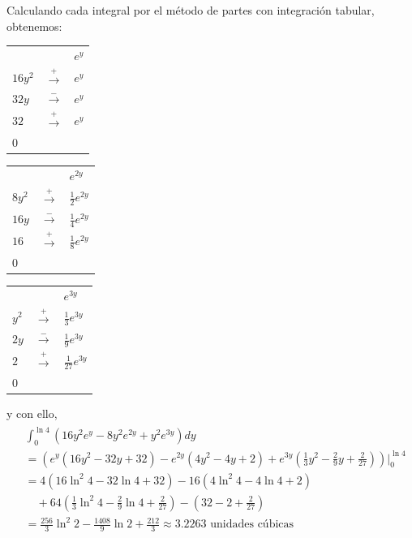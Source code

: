 Calculando cada integral por el método de partes con integración tabular,
obtenemos:
\begin{center}
  \begin{tabular}{lll}
    & & $e^{y}$ \\
    $16y^{2}$ & $\overset{+}{\longrightarrow }$ & $e^{y}$ \\
    $32y$ & $\overset{-}{\longrightarrow }$ & $e^{y}$ \\
    $32$ & $\overset{+}{\longrightarrow }$ & $e^{y}$ \\
    $0$ & &
  \end{tabular}
  \quad\quad
  \begin{tabular}{lll}
    & & $e^{2y}$ \\
    $8y^{2}$ & $\overset{+}{\longrightarrow }$ & $\frac{1}{2}e^{2y}$ \\
    $16y$ & $\overset{-}{\longrightarrow }$ & $\frac{1}{4}e^{2y}$ \\
    $16$ & $\overset{+}{\longrightarrow }$ & $\frac{1}{8}e^{2y}$ \\
    $0$ & &
  \end{tabular}
  \quad\quad
  \begin{tabular}{lll}
    & & $e^{3y}$ \\
    $y^{2}$ & $\overset{+}{\longrightarrow }$ & $\frac{1}{3}e^{3y}$ \\
    $2y$ & $\overset{-}{\longrightarrow }$ & $\frac{1}{9}e^{3y}$ \\
    $2$ & $\overset{+}{\longrightarrow }$ & $\frac{1}{27}e^{3y}$ \\
    $0$ & &
  \end{tabular}
\end{center}

y con ello,
\begin{gather*}
  \begin{aligned}
    &\int_{0}^{\ln 4}\left(
    16y^{2}e^{y}-8y^{2}e^{2y}+y^{2}e^{3y}\right) dy\\
    &=\left( e^{y}\left( 16y^{2}-32y+32\right) -e^{2y}\left( 4y^{2}-4y+2\right)
    +e^{3y}\left( \frac{1}{3}y^{2}-\frac{2}{9}y+\frac{2}{27}\right) \right)\Bigg|_{0}^{\ln 4} \\
    &=4\left( 16\ln ^{2}4-32\ln 4+32\right) -16\left( 4\ln ^{2}4-4\ln
    4+2\right) \\
    &\quad +64\left( \frac{1}{3}\ln ^{2}4-\frac{2}{9}\ln 4+\frac{2}{27}\right)-\left( 32-2+\frac{2}{27}\right) \\
    &=\frac{256}{3}\ln ^{2}2-\frac{1408}{9}\ln 2+\frac{212}{3} \approx 3.2263\text{ unidades cúbicas}
  \end{aligned}
\end{gather*}

